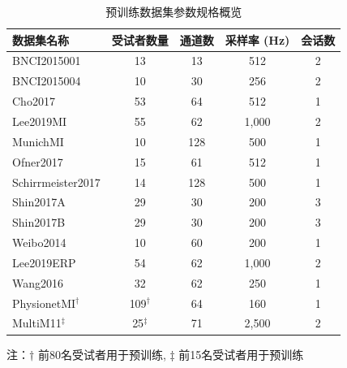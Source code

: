 \begin{table}[htbp]
\centering
\caption{预训练数据集参数规格概览}
\label{tab:5-1}
\begin{tabular}{lcccc}
\toprule
数据集名称 & 受试者数量 & 通道数 & 采样率 (Hz) & 会话数 \\
\midrule
BNCI2015001\cite{faller2012autocalibration} & 13 & 13 & 512 & 2 \\
BNCI2015004\cite{scherer2015individually} & 10 & 30 & 256 & 2 \\
Cho2017\cite{cho2017eeg} & 53 & 64 & 512 & 1 \\
Lee2019MI\cite{lee2019eeg} & 55 & 62 & 1,000 & 2 \\
MunichMI\cite{grosse2009beamforming} & 10 & 128 & 500 & 1 \\
Ofner2017\cite{ofner2017upper} & 15 & 61 & 512 & 1 \\
Schirrmeister2017\cite{schirrmeister2017deep} & 14 & 128 & 500 & 1 \\
Shin2017A\cite{shin2016open} & 29 & 30 & 200 & 3 \\
Shin2017B\cite{shin2016open} & 29 & 30 & 200 & 3 \\
Weibo2014\cite{yi2014evaluation} & 10 & 60 & 200 & 1 \\
Lee2019ERP\cite{lee2019eeg} & 54 & 62 & 1,000 & 2 \\
Wang2016\cite{wang2016benchmark} & 32 & 62 & 250 & 1 \\
PhysionetMI$^{\dagger}$\cite{goldberger_physiobank_2000, schalk2004bci2000} & 109$^{\dagger}$ & 64 & 160 & 1 \\
MultiM11$^{\ddagger}$\cite{jeong_multimodal_2020} & 25$^{\ddagger}$ & 71 & 2,500 & 2 \\
\bottomrule
\end{tabular}
\begin{tablenotes}
\footnotesize
\item[]\centering 注：$\dagger$ 前80名受试者用于预训练, $\ddagger$ 前15名受试者用于预训练
\end{tablenotes}
\end{table}

